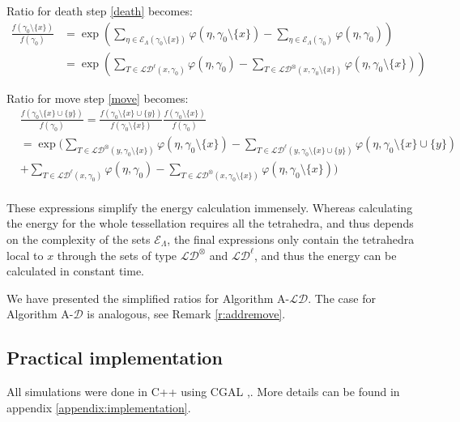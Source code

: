Ratio for death step \eqref{death} becomes:
\begin{align*}
\frac{f(\gamma_0 \setminus\{x\})}{f(\gamma_0)}&= \exp\left({\sum_{\eta\in \mathcal E_\Lambda(\gamma_0 \setminus\{x\})} \varphi(\eta,\gamma_0 \setminus\{x\})- \sum_{\eta\in \mathcal E_\Lambda(\gamma_0)}\varphi(\eta,\gamma_0)}\right)\\
&= \exp\left( \sum_{T\in \mathcal {LD}^\ell (x,\gamma_0)} \varphi(\eta,\gamma_0) - \sum_{T \in \mathcal {LD}^\otimes (x,\gamma_0 \setminus\{x\} )} \varphi(\eta,\gamma_0 \setminus\{x\})   \right)
\end{align*}

Ratio for move step \eqref{move} becomes:
\begin{align*}
& \frac{f(\gamma_0 \setminus\{x\} \cup\{y\})}{f(\gamma_0)}= 
\frac{f(\gamma_0 \setminus\{x\} \cup\{y\})}{f(\gamma_0 \setminus\{x\})} \frac{f(\gamma_0 \setminus\{x\})}{f(\gamma_0)} \\ 
&= \exp \Bigg(  \sum_{T \in \mathcal {LD}^\otimes (y,\gamma_0 \setminus\{x\})} \varphi(\eta,\gamma_0 \setminus\{x\})  - \sum_{T\in \mathcal {LD}^\ell (y,\gamma_0 \setminus\{x\} \cup\{y\})} \varphi(\eta,\gamma_0 \setminus\{x\} \cup\{y\})  \\
&+ \sum_{T\in \mathcal {LD}^\ell (x,\gamma_0)} \varphi(\eta,\gamma_0) - \sum_{T \in \mathcal {LD}^\otimes (x,\gamma_0 \setminus\{x\})} \varphi(\eta,\gamma_0 \setminus\{x\}) \Bigg) \\
\end{align*}


These expressions simplify the energy calculation immensely. Whereas calculating the energy for the whole tessellation requires all the tetrahedra, and thus depends on the complexity of the sets $\mathcal E_\Lambda$, the final expressions only contain the tetrahedra local to $x$ through the sets of type $\mathcal {LD}^\otimes$ and $\mathcal {LD}^\ell$, and thus the energy can be calculated in constant time.

We have presented the simplified ratios for Algorithm A-$\mathcal {LD}$. The case for Algorithm A-$\mathcal D$ is analogous, see Remark \ref{r:addremove}.

\subsection{Practical implementation}\label{sec:practical}
All simulations were done in C++ using CGAL \cite{cgal},\cite{cgal:3d-triang}. More details can be found in appendix \ref{appendix:implementation}.
